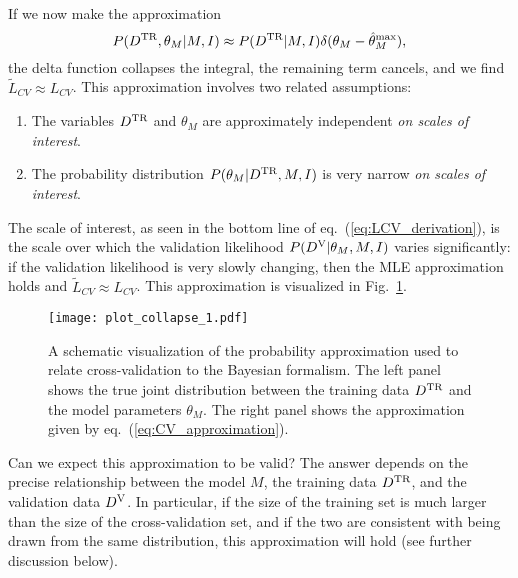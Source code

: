 \documentclass[12pt,pdftex]{article}
\newcommand{\Dtr}{\ensuremath{D^{\rm TR}}}
\newcommand{\Dva}{\ensuremath{D^{\rm V}}}
\newcommand{\eqn}[1]{eq.~(\ref{eq:#1})}
\newcommand{\fig}[1]{Fig.~\ref{fig:#1}}
\begin{document}
If we now make the approximation
\begin{equation}
  \label{eq:CV_approximation}
  P(\Dtr,\theta_M|M,I) \approx P(\Dtr|M, I)
                               \delta(\theta_M - \hat{\theta}^{\max}_M),
\end{equation}
the delta function collapses the integral, the remaining term cancels,
and we find $\widetilde{L}_{CV} \approx {L}_{CV}$.  This approximation
involves two related assumptions:
\begin{enumerate}
  \item The variables \Dtr{} and $\theta_M$ are approximately independent
    {\it on scales of interest}.
  \item The probability distribution $P(\theta_M|\Dtr, M, I)$ is very narrow
    {\it on scales of interest}.
\end{enumerate}
The scale of interest, as seen in the bottom line of \eqn{LCV_derivation},
is the scale over which the validation likelihood $P(\Dva|\theta_M, M, I)$
varies significantly: if the validation likelihood is very slowly changing,
then the MLE approximation holds and $\widetilde{L}_{CV} \approx {L}_{CV}$.
This approximation is visualized in \fig{approx_vis}.

\begin{figure}
  \centering
  \texttt{[image: plot\_collapse\_1.pdf]}
  \caption{A schematic visualization of the probability approximation used to
    relate cross-validation to the Bayesian formalism.  The left panel shows
    the true joint distribution between the training data \Dtr{} and the
    model parameters $\theta_M$.  The right panel shows the approximation
    given by \eqn{CV_approximation}.}
  \label{fig:approx_vis}
\end{figure}

Can we expect this approximation to be valid?  The answer depends on the
precise relationship between the model $M$, the training data \Dtr, and
the validation data \Dva{}.  In particular, if the size of the training set
is much larger than the size of the cross-validation set, and if the two
are consistent with being drawn from the same distribution, this approximation
will hold (see further discussion below).
\end{document}
